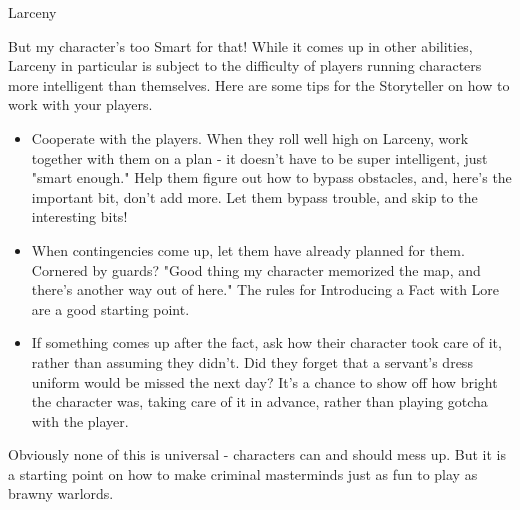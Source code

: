 \begin{Ability}{Larceny}
\begin{sidebar}{But my character's too Smart for that!}
  While it comes up in other abilities, Larceny in particular is subject to the difficulty of players running characters more intelligent than themselves. Here are some tips for the Storyteller on how to work with your players.

  \begin{itemize}
    \item Cooperate with the players. When they roll well high on Larceny, work together with them on a plan - it doesn't have to be super intelligent, just "smart enough." Help them figure out how to bypass obstacles, and, here's the important bit, don't add more. Let them bypass trouble, and skip to the interesting bits!
    \item When contingencies come up, let them have already planned for them. Cornered by guards? "Good thing my character memorized the map, and there's another way out of here." The rules for Introducing a Fact with Lore are a good starting point.
    \item If something comes up after the fact, ask how their character took care of it, rather than assuming they didn't. Did they forget that a servant's dress uniform would be missed the next day? It's a chance to show off how bright the character was, taking care of it in advance, rather than playing gotcha with the player.
  \end{itemize}

  Obviously none of this is universal - characters can and should mess up. But it is a starting point on how to make criminal masterminds just as fun to play as brawny warlords.
\end{sidebar}


\end{Ability}
